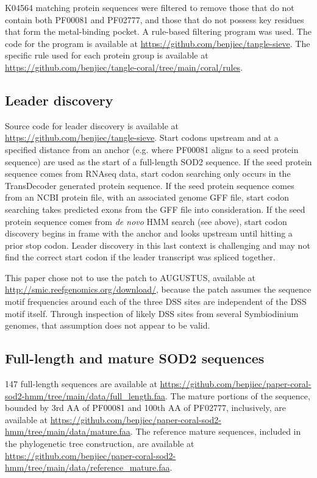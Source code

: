 K04564 matching protein sequences were filtered to remove those that do not
contain both PF00081 and PF02777, and those that do not possess key residues
that form the metal-binding pocket. A rule-based filtering program was used.
The code for the program is available at
\url{https://github.com/benjiec/tangle-sieve}. The specific rule used for
each protein group is available at
\url{https://github.com/benjiec/tangle-coral/tree/main/coral/rules}.


\subsection*{Leader discovery}

Source code for leader discovery is available at
\url{https://github.com/benjiec/tangle-sieve}.  Start codons upstream and at
a specified distance from an anchor (e.g. where PF00081 aligns to a seed
protein sequence) are used as the start of a full-length SOD2 sequence. If the
seed protein sequence comes from RNAseq data, start codon searching only occurs
in the TransDecoder generated protein sequence. If the seed protein sequence
comes from an NCBI protein file, with an associated genome GFF file, start codon
searching takes predicted exons from the GFF file into consideration. If the
seed protein sequence comes from \textit{de novo} HMM search (see above), start
codon discovery begins in frame with the anchor and looks upstream until
hitting a prior stop codon. Leader discovery in this last context is
challenging and may not find the correct start codon if the leader transcript
was spliced together.

This paper chose not to use the patch to AUGUSTUS, available at
\url{http://smic.reefgenomics.org/download/}, because the patch assumes the
sequence motif frequencies around each of the three DSS sites are independent
of the DSS motif itself. Through inspection of likely DSS sites from several
Symbiodinium genomes, that assumption does not appear to be valid.


\subsection*{Full-length and mature SOD2 sequences}

147 full-length sequences are available at
\url{https://github.com/benjiec/paper-coral-sod2-hmm/tree/main/data/full_length.faa}.
The mature portions of the sequence, bounded by 3rd AA of PF00081 and 100th AA
of PF02777, inclusively, are available at
\url{https://github.com/benjiec/paper-coral-sod2-hmm/tree/main/data/mature.faa}.
The reference mature sequences, included in the phylogenetic tree construction,
are available at
\url{https://github.com/benjiec/paper-coral-sod2-hmm/tree/main/data/reference_mature.faa}.

